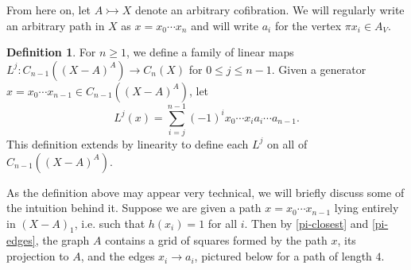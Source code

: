 \documentclass[11pt]{article}
\theoremstyle{definition}
\newtheorem{defi}[theo]{Definition}
\numberwithin{equation}{section}
\newcommand{\W}{(X - A)_1}
\newcommand{\cto}{\rightarrowtail}
\begin{document}
From here on, let $A \cto X$ denote an arbitrary cofibration. We will regularly write an arbitrary path in $X$ as $x = x_0 \cdots x_n$ and will write $a_i$ for the vertex $\pi x_i \in A_V$.

\begin{defi}\label{L-def}
For $n \geq 1$, we define a family of linear maps $L^j \colon C_{n-1}((X - A)^A) \to C_n(X)$ for $0 \leq j \leq  n-1$. Given a generator $x = x_0 \cdots x_{n-1} \in C_{n-1}((X - A)^A)$, let
\[
L^j(x) = \sum_{i = j}^{n-1} (-1)^i x_0 \cdots x_i a_i \cdots a_{n-1}.
\]
This definition extends by linearity to define each $L^j$ on all of $C_{n-1}((X - A)^A)$.
\end{defi}

As the definition above may appear very technical, we will briefly discuss some of the intuition behind it. Suppose we are given a path $x = x_0 \cdots x_{n-1}$ lying entirely in $\W$, i.e.  such that $h(x_i) = 1$ for all $i$. Then by \cref{pi-closest} and \cref{pi-edges}, the graph $A$ contains a grid of squares formed by the path $x$, its projection to $A$, and the edges $x_i \to a_i$, pictured below for a path of length $4$.

\begin{figure}[H]
    \centering
\end{figure}
\end{document}
